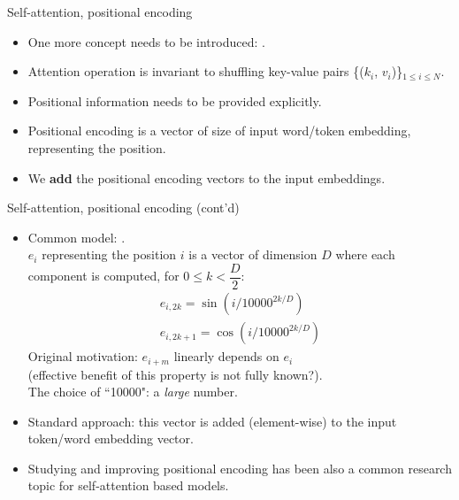 \begin{frame}{Self-attention, positional encoding}
\vspace{-4mm}
\begin{itemize}
\item One more concept needs to be introduced: .
\item Attention operation is invariant to shuffling key-value pairs \{($k_i$, $v_i$)\}$_{1 \leq i \leq N}$.
\item Positional information needs to be provided explicitly.
\item Positional encoding is a vector of size of input word/token embedding,
representing the position.
\item We \textbf{add} the positional encoding vectors to the input embeddings.
\end{itemize}
\end{frame}

\begin{frame}{Self-attention, positional encoding (cont'd)}
\begin{itemize}
\item Common model: .\\ $e_i$ representing the position $i$ is a vector of dimension $D$ where each component is computed, for $0 \leq k < \dfrac{D}{2}$:
                \begin{eqnarray*}
                        e_{i,2k} = \sin(i/10000^{2k/D}) \\
                        e_{i,2k+1} = \cos(i/10000^{2k/D})
                \end{eqnarray*}
\pause
Original motivation: $e_{i+m}$ linearly depends on $e_i$ \\(effective benefit of this property is not fully known?).\\
The choice of ``10000": a \textit{large} number.
\pause
\item Standard approach: this vector is added (element-wise) to the input token/word embedding vector.
\pause
\item Studying and improving positional encoding has been also a common research topic
for self-attention based models.
\end{itemize}
\end{frame}

